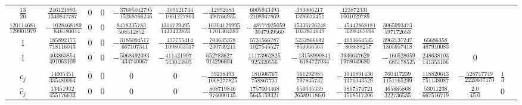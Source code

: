 \begin{table*}
\begin{tabular}{c|cccccccccccccc}
   $\frac{13}{20}$ &     $\frac{246121993}{1340847787}$ &  0 &  0 &  $-\frac{37695042795}{15268766246}$ &
    $-\frac{309121744}{1061227803}$ & $-\frac{12992083}{490766935}$ & $\frac{6005943493}{2108947869}$ &
    $\frac{393006217}{1396673457}$ & $\frac{123872331}{1001029789}$ & \vspace{.1in} \\
    $\frac{1201146811}{1299019798}$ &     $-\frac{1028468189}{ 846180014}$ &  0 &  0 & $\frac{8478235783}{508512852}$ &
    $\frac{1311729495}{1432422823}$ &  $-\frac{10304129995}{1701304382}$ &
    $-\frac{48777925059}{3047939560}$ & $\frac{15336726248}{1032824649}$ &
    $-\frac{45442868181}{3398467696}$ & $\frac{3065993473}{597172653}$ & \vspace{.1in} \\
    1 &     $\frac{185892177}{ 718116043}$ & 0 & 0 & $-\frac{3185094517}{667107341}$ &
    $-\frac{477755414}{1098053517}$ & $-\frac{703635378}{230739211}$ &
    $\frac{5731566787}{1027545527}$ & $\frac{5232866602}{850066563}$ &
    $-\frac{4093664535}{808688257}$ & $\frac{3962137247}{1805957418}$ &
    $\frac{65686358}{487910083}$ & \vspace{.1in} \\
    1 &     $\frac{403863854}{491063109}$ & 0 & 0 & $-\frac{5068492393}{434740067}$ &
    $-\frac{411421997}{543043805}$ & $\frac{652783627}{914296604}$ &
    $\frac{11173962825}{925320556}$ & $-\frac{13158990841}{6184727034}$ &
    $\frac{3936647629}{1978049680}$ & $-\frac{160528059}{685178525}$ &
    $\frac{248638103}{1413531060}$ & 0 & \vspace{.1in}\\ \hline  \\
   $c_j$ & $\frac{14005451 }{ 335480064}$ &  0 &  0 &  0 & 0 &
   $-\frac{59238493}{1068277825}$ & $\frac{ 181606767 }{758867731}$ &
   $\frac{561292985 }{ 797845732}$ & $-\frac{1041891430}{ 1371343529}$ &
   $\frac{760417239}{ 1151165299}$ & $\frac{118820643}{ 751138087}$ &
   $-\frac{528747749}{ 2220607170}$ & $\frac{1}{4}$  \vspace{.1in} \\
   $\hat{c}_j$ & $\frac{ 13451932 }{ 455176623 }$ & 0 & 0 & 0 & 0 & $-\frac{808719846}{976000145}$ &
   $\frac{1757004468}{5645159321}$ & $\frac{656045339}{265891186.0}$ & $-\frac{3867574721}{1518517206}$
   & $\frac{465885868}{322736535}$ & $\frac{53011238}{ 667516719}$
   &  $\frac{ 2.0 }{ 45.0}$ &  0 \\
  \hline\hline
\end{tabular}
\label{Table:PD78Coefficients}
\end{table*}
